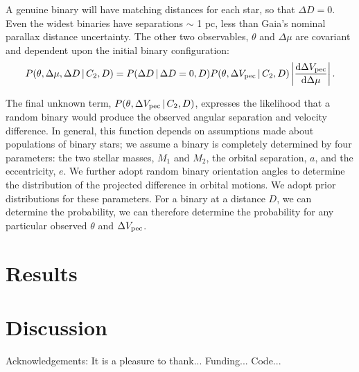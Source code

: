 \documentclass[12pt, preprint]{aastex}
\newcommand{\given}{\,|\,}
\newcommand{\dd}{\mathrm{d}}
\begin{document}
A genuine binary will have matching distances for each star, so that $\Delta D = 0$. Even the widest binaries have separations $\sim$ 1 pc, less than Gaia's nominal parallax distance uncertainty. The other two observables, $\theta$ and $\Delta \mu$ are covariant and dependent upon the initial binary configuration:
\begin{equation}
P(\theta, \Delta \mu, \Delta D \given C_2, D) = P(\Delta D \given \Delta D=0, D) P(\theta, \Delta V_{\rm pec} \given C_2, D) \left| \frac{\dd \Delta V_{\rm pec}}{\dd \Delta \mu} \right|.
\end{equation}

The final unknown term, $P(\theta, \Delta V_{\rm pec} \given C_2, D)$, expresses the likelihood that a random binary would produce the observed angular separation and velocity difference. In general, this function depends on assumptions made about populations of binary stars; we assume a binary is completely determined by four parameters: the two stellar masses, $M_1$ and $M_2$, the orbital separation, $a$, and the eccentricity, $e$. We further adopt random binary orientation angles to determine the distribution of the projected difference in orbital motions. We adopt prior distributions for these parameters. For a binary at a distance $D$, we can determine the probability, we can therefore determine the probability for any particular observed $\theta$ and $\Delta V_{\rm pec}$.




\section{Results}


\section{Discussion}



\acknowledgements
Acknowledgements:
It is a pleasure to thank...
Funding...
Code...
\end{document}
